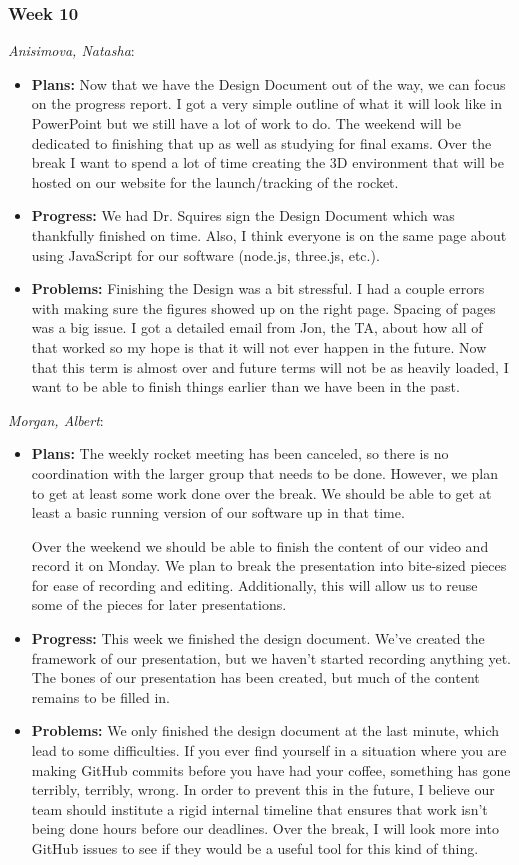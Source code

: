 \documentclass[10pt,draftclsnofoot,onecolumn]{IEEEtran}
\newcommand{\subsubsubsection}[1]{
	\hfill\break\textit{#1}:
}
\begin{document}
\subsubsection{Week 10}
\subsubsubsection{Anisimova, Natasha}
\begin{itemize}
	\item \textbf{Plans: }
	Now that we have the Design Document out of the way, we can focus on the progress report. I got a very simple outline of what it will look like in PowerPoint but we still have a lot of work to do. The weekend will be dedicated to finishing that up as well as studying for final exams. Over the break I want to spend a lot of time creating the 3D environment that will be hosted on our website for the launch/tracking of the rocket.
	\item \textbf{Progress: }
	We had Dr. Squires sign the Design Document which was thankfully finished on time. Also, I think everyone is on the same page about using JavaScript for our software (node.js, three.js, etc.).
	\item \textbf{Problems: }
	Finishing the Design was a bit stressful. I had a couple errors with making sure the figures showed up on the right page. Spacing of pages was a big issue. I got a detailed email from Jon, the TA, about how all of that worked so my hope is that it will not ever happen in the future. Now that this term is almost over and future terms will not be as heavily loaded, I want to be able to finish things earlier than we have been in the past.
\end{itemize}
\subsubsubsection{Morgan, Albert}
\begin{itemize}
	\item \textbf{Plans: }
	The weekly rocket meeting has been canceled, so there is no coordination with the larger group that needs to be done. However, we plan to get at least some work done over the break. We should be able to get at least a basic running version of our software up in that time.

	Over the weekend we should be able to finish the content of our video and record it on Monday. We plan to break the presentation into bite-sized pieces for ease of recording and editing. Additionally, this will allow us to reuse some of the pieces for later presentations.
	\item \textbf{Progress: }
	This week we finished the design document. We've created the framework of our presentation, but we haven't started recording anything yet. The bones of our presentation has been created, but much of the content remains to be filled in.
	\item \textbf{Problems: }
	We only finished the design document at the last minute, which lead to some difficulties. If you ever find yourself in a situation where you are making GitHub commits before you have had your coffee, something has gone terribly, terribly, wrong. In order to prevent this in the future, I believe our team should institute a rigid internal timeline that ensures that work isn't being done hours before our deadlines. Over the break, I will look more into GitHub issues to see if they would be a useful tool for this kind of thing.
\end{itemize}
\end{document}
